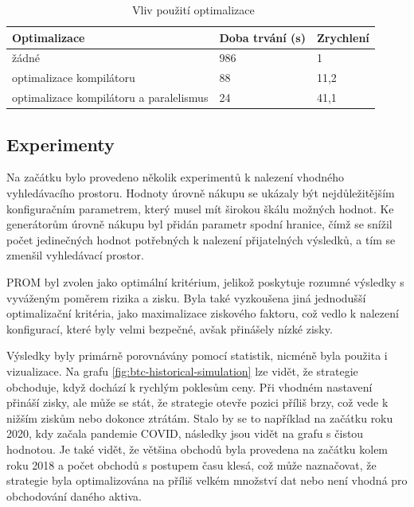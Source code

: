 \begin{table}[!htbp]
\centering
\caption[Vliv použití optimalizace]{~Vliv použití optimalizace}\label{tab:brute:force:optimization}
\begin{tabular}{|l|l|l|}
\hline
\textbf{Optimalizace}                  & \textbf{Doba trvání (s)} & \textbf{Zrychlení} \\ \hline
žádné                                   & 986                      & 1                                                     \\ \hline
optimalizace kompilátoru                & 88                       & 11,2                                                  \\ \hline
optimalizace kompilátoru a paralelismus & 24                       & 41,1                                                   \\ \hline
\end{tabular}
\end{table}

\subsection{Experimenty}
Na začátku bylo provedeno několik experimentů k nalezení vhodného vyhledávacího prostoru.
Hodnoty úrovně nákupu se ukázaly být nejdůležitějším konfiguračním parametrem, který musel mít širokou škálu možných hodnot.
Ke generátorům úrovně nákupu byl přidán parametr spodní hranice, čímž se snížil počet jedinečných hodnot potřebných k nalezení přijatelných výsledků, a tím se zmenšil vyhledávací prostor.

PROM byl zvolen jako optimální kritérium, jelikož poskytuje rozumné výsledky s vyváženým poměrem rizika a zisku.
Byla také vyzkoušena jiná jednodušší optimalizační kritéria, jako maximalizace ziskového faktoru, což vedlo k nalezení konfigurací, které byly velmi bezpečné, avšak přinášely nízké zisky.

Výsledky byly primárně porovnávány pomocí statistik, nicméně byla použita i vizualizace.
Na grafu \ref{fig:btc-historical-simulation} lze vidět, že strategie obchoduje, když dochází k rychlým poklesům ceny.
Při vhodném nastavení přináší zisky, ale může se stát, že strategie otevře pozici příliš brzy, což vede k nižším ziskům nebo dokonce ztrátám.
Stalo by se to například na začátku roku 2020, kdy začala pandemie COVID, následky jsou vidět na grafu s čistou hodnotou.
Je také vidět, že většina obchodů byla provedena na začátku kolem roku 2018 a počet obchodů s postupem času klesá, což může naznačovat, že strategie byla optimalizována na příliš velkém množství dat nebo není vhodná pro obchodování daného aktiva.

